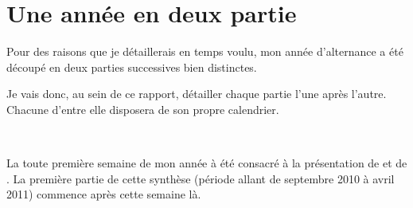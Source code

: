 \chapter{Une année en deux partie}
Pour des raisons que je détaillerais en temps voulu, mon année d'alternance a été découpé en deux parties successives bien distinctes.

Je vais donc, au sein de ce rapport, détailler chaque partie l'une après l'autre. Chacune d'entre elle disposera de son propre calendrier.

~

La toute première semaine de mon année à été consacré à la présentation de \solulog{} et de \integrale. La première partie de cette synthèse (période allant de septembre 2010 à avril 2011) commence après cette semaine là.
